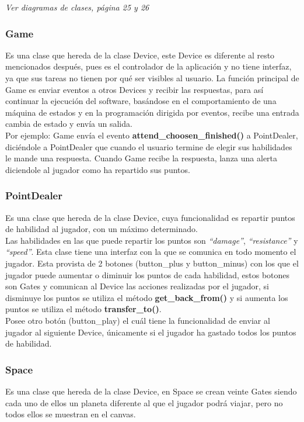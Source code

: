 \documentclass[a4paper,10pt]{article}
\begin{document}
\emph{Ver diagramas de clases, página 25 y 26}

\subsubsection{Game}
Es una clase que hereda de la clase Device, este Device es diferente al resto mencionados después, pues es el controlador de la aplicación
y no tiene interfaz, ya que sus tareas no tienen por qué ser visibles al usuario.
La función principal de Game es enviar eventos a otros Devices y recibir las respuestas, para así continuar la ejecución del software, basándose
en el comportamiento de una máquina de estados y en la programación dirigida por eventos, 
recibe una entrada cambia de estado y envía un salida.\\

Por ejemplo: Game envía el evento \textbf{attend\_choosen\_finished()} a PointDealer, diciéndole a PointDealer que cuando el usuario termine
de elegir sus habilidades le mande una respuesta. Cuando Game recibe la respuesta, lanza una alerta diciendole al jugador como ha repartido
sus puntos.

\subsubsection{PointDealer}
Es una clase que hereda de la clase Device, cuya funcionalidad 
es repartir puntos de habilidad al jugador, con un máximo determinado.\\

Las habilidades en las que puede repartir los puntos son \emph{“damage”}, 
\emph{“resistance”} y \emph{“speed”}. Esta clase tiene una interfaz con la que se 
comunica en todo momento el jugador. Esta provista de 2 botones (button\_plus
y button\_minus) con los que el jugador puede aumentar o diminuir los 
puntos de cada habilidad, estos botones son Gates y comunican al Device las acciones realizadas por el jugador, 
si disminuye los puntos se utiliza el método \textbf{get\_back\_from()} y si aumenta los puntos se utiliza el método \textbf{transfer\_to()}.\\

Posee otro botón (button\_play) el cuál tiene la funcionalidad de enviar al 
jugador al siguiente Device, únicamente si el jugador ha gastado todos los 
puntos de habilidad.

\subsubsection{Space}
Es una clase que hereda de la clase Device, 
en Space se crean veinte Gates siendo cada uno de ellos un planeta
diferente al que el jugador podrá viajar, pero no todos ellos se muestran 
en el canvas.\\
\end{document}
